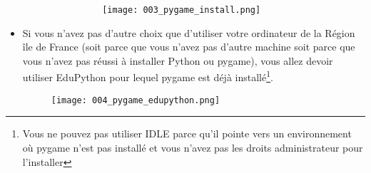 \documentclass[11pt]{article}
\begin{document}
\begin{itemize}
\begin{itemize}
\begin{itemize}
\begin{itemize}
					\begin{figure}[H]
						\centering
						\texttt{[image: 003\_pygame\_install.png]}
					\end{figure}
				\end{itemize}
			\end{itemize}
		\end{itemize}
		\item Si vous n'avez pas d'autre choix que d'utiliser votre ordinateur de la Région île de France (soit parce que vous n'avez pas d'autre machine soit parce que vous n'avez pas réussi à installer Python ou pygame), vous allez devoir utiliser EduPython pour lequel pygame est déjà installé\footnote{Vous ne pouvez pas utiliser IDLE parce qu'il pointe vers un environnement où pygame n'est pas installé et vous n'avez pas les droits administrateur pour l'installer}.
		\begin{figure}[H]
			\centering
			\texttt{[image: 004\_pygame\_edupython.png]}
		\end{figure}
	\end{itemize}
		
\end{document}
